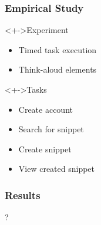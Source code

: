
\begin{frame}
  \frametitle{Empirical Study}

  \begin{block}<+->{Experiment}
    \begin{itemize}
      \item Timed task execution
      \item Think-aloud elements
    \end{itemize}
  \end{block}

  \begin{block}<+->{Tasks}
    \begin{itemize}
      \item Create account
      \item Search for snippet
      \item Create snippet
      \item View created snippet
    \end{itemize}
  \end{block}
\end{frame}

\begin{frame}
  \frametitle{Results}

  \center \huge ?
\end{frame}